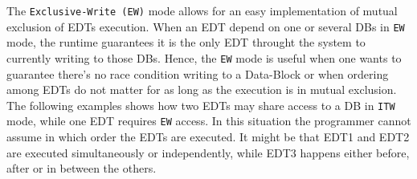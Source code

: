 The {\tt Exclusive-Write (EW)} mode allows for an easy implementation of mutual exclusion of EDTs execution. When an EDT depend on one or several DBs in {\tt EW} mode, the runtime guarantees it is the only EDT throught the system to currently writing to those DBs.
Hence, the {\tt EW} mode is useful when one wants to guarantee there's no race condition writing to a Data-Block or when ordering among EDTs do not matter for as long as the execution is in mutual exclusion. The following examples shows how two EDTs may share access to a DB in {\tt ITW} mode, while one EDT requires {\tt EW} access. In this situation the programmer cannot assume in which order the EDTs are executed. It might be that EDT1 and EDT2 are executed simultaneously or independently, while EDT3 happens either before, after or in between the others.


